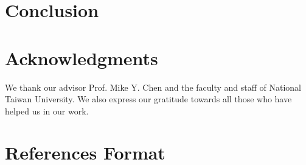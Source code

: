 \documentclass{sigchi}
\begin{document}



\section{Conclusion}



\section{Acknowledgments}
We thank our advisor Prof. Mike Y. Chen and the faculty and staff of National Taiwan University. We also express our gratitude towards all those who have helped us in our work.

%
%
%
%
%
\balance{}

\section{References Format}




\end{document}
